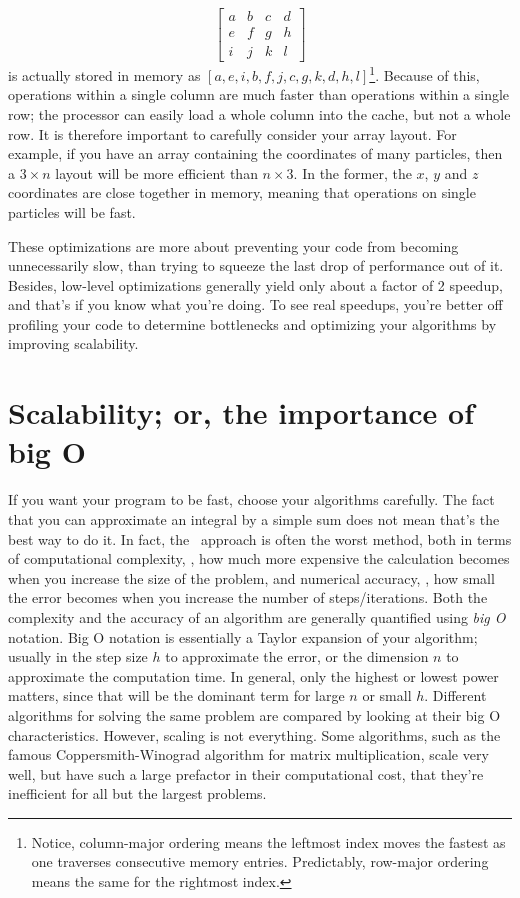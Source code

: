 \begin{itemize}
\begin{equation*}
    \begin{bmatrix}
        a & b & c & d \\
        e & f & g & h \\
        i & j & k & l
    \end{bmatrix}
    \end{equation*}
    is actually stored in memory as $\left[a,e,i,b,f,j,c,g,k,d,h,l\right]$\footnote{Notice, column-major ordering means the leftmost index moves the fastest as one traverses consecutive memory entries. Predictably, row-major ordering means the same for the rightmost index.}.
    Because of this, operations within a single column are much faster than operations within a single row; the processor can easily load a whole column into the cache, but not a whole row.
    It is therefore important to carefully consider your array layout.
    For example, if you have an array containing the coordinates of many particles, then a $3\times n$ layout will be more efficient than $n\times 3$.
    In the former, the $x$, $y$ and $z$ coordinates are close together in memory, meaning that operations on single particles will be fast.
\end{itemize}
These optimizations are more about preventing your code from becoming unnecessarily slow, than trying to squeeze the last drop of performance out of it.
Besides, low-level optimizations generally yield only about a factor of 2 speedup, and that's if you know what you're doing.
To see real speedups, you're better off profiling your code to determine bottlenecks and optimizing your algorithms by improving scalability.

\section{Scalability; or, the importance of big O}

If you want your program to be fast, choose your algorithms carefully.
The fact that you can approximate an integral by a simple sum does not mean that's the best way to do it.
In fact, the \naive\ approach is often the worst method, both in terms of computational complexity, \ie, how much more expensive the calculation becomes when you increase the size of the problem, and numerical accuracy, \ie, how small the error becomes when you increase the number of steps/iterations.
Both the complexity and the accuracy of an algorithm are generally quantified using \emph{big O} notation.
Big O notation is essentially a Taylor expansion of your algorithm; usually in the step size $h$ to approximate the error, or the dimension $n$ to approximate the computation time.
In general, only the highest or lowest power matters, since that will be the dominant term for large $n$ or small $h$.
Different algorithms for solving the same problem are compared by looking at their big O characteristics.
However, scaling is not everything.
Some algorithms, such as the famous Coppersmith-Winograd algorithm for matrix multiplication, scale very well, but have such a large prefactor in their computational cost, that they're inefficient for all but the largest problems.

